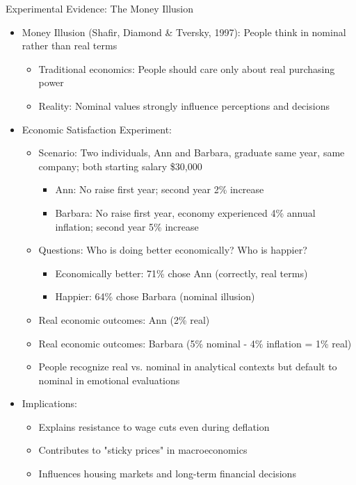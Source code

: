 \documentclass[10pt,handout]{beamer}
\begin{document}
\begin{frame}{Experimental Evidence: The Money Illusion}
  \begin{itemize}[<+->]
    \item Money Illusion (Shafir, Diamond \& Tversky, 1997): People think in nominal rather than real terms
      \begin{itemize}
        \item Traditional economics: People should care only about real purchasing power
        \item Reality: Nominal values strongly influence perceptions and decisions
      \end{itemize}
    \item Economic Satisfaction Experiment:
      \begin{itemize}
        \item Scenario: Two individuals, Ann and Barbara, graduate same year, same company; both starting salary 
          \$30,000
          \begin{itemize}
            \item Ann: No raise first year; second year 2\% increase
            \item Barbara: No raise first year, economy experienced 4\% annual inflation; second year 5\% increase 
          \end{itemize}
        \item Questions: Who is doing better economically? Who is happier?
          \begin{itemize}
            \item Economically better: 71\% chose Ann (correctly, real terms)
            \item Happier: 64\% chose Barbara (nominal illusion)
          \end{itemize}
        \item Real economic outcomes: Ann (2\% real)
        \item Real economic outcomes: Barbara (5\% nominal - 4\% inflation = 1\% real)
        \item People recognize real vs. nominal in analytical contexts but default to nominal in emotional evaluations
      \end{itemize}
    \item Implications:
      \begin{itemize}
        \item Explains resistance to wage cuts even during deflation
        \item Contributes to "sticky prices" in macroeconomics
        \item Influences housing markets and long-term financial decisions
      \end{itemize}
  \end{itemize}
\end{frame}
\end{document}

